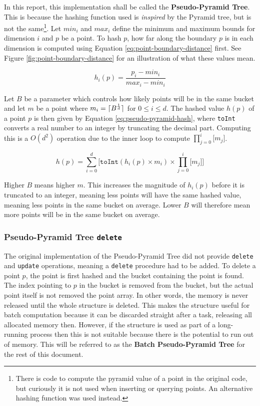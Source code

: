 In this report, this implementation shall be called the \textbf{Pseudo-Pyramid Tree}. This is because the hashing function used is \textit{inspired} by the Pyramid tree, but is not the same\footnote{There is code to compute the pyramid value of a point in the original code, but curiously it is not used when inserting or querying points. An alternative hashing function was used instead.}. Let $min_i$ and $max_i$ define the minimum and maximum bounds for dimension $i$ and $p$ be a point. To hash $p$, how far along the boundary $p$ is in each dimension is computed using Equation \ref{eq:point-boundary-distance} first. See Figure \ref{fig:point-boundary-distance} for an illustration of what these values mean.

\begin{equation}
	h_i(p) = \frac{p_i - min_i}{max_i - min_i}
	\label{eq:point-boundary-distance}
\end{equation}

Let $B$ be a parameter which controls how likely points will be in the same bucket and let $m$ be a point where $m_i = \lceil B^{\frac{1}{d}}\rceil$ for $0 \leq i \leq d$. The hashed value $h(p)$ of a point $p$ is then given by Equation \ref{eq:pseudo-pyramid-hash},  where \texttt{toInt} converts a real number to an integer by truncating the decimal part. Computing this is a $O(d^2)$ operation due to the inner loop to compute $\prod_{j=0}^{i}{\lbrack m_j \rbrack}$.

\begin{equation}
	h(p) = \sum_{i = 0}^{d} { \lbrack \texttt{toInt}( h_i(p) \times m_i ) \times \prod_{j=0}^{i}{\lbrack m_j \rbrack} \rbrack }
	\label{eq:pseudo-pyramid-hash}
\end{equation}

Higher $B$ means higher $m$. This increases the magnitude of $h_i(p)$ before it is truncated to an integer, meaning less points will have the same hashed value, meaning less points in the same bucket on average. Lower $B$ will therefore mean more points will be in the same bucket on average.

\subsubsection{Pseudo-Pyramid Tree \texttt{delete}}

The original implementation of the Pseudo-Pyramid Tree did not provide \texttt{delete} and \texttt{update} operations, meaning a \texttt{delete} procedure had to be added. To delete a point $p$, the point is first hashed and the bucket containing the point is found. The index pointing to $p$ in the bucket is removed from the bucket, but the actual point itself is not removed the point array. In other words, the memory is never released until the whole structure is deleted. This makes the structure useful for batch computation because it can be discarded straight after a task, releasing all allocated memory then. However, if the structure is used as part of a long-running process then this is not suitable because there is the potential to run out of memory. This will be referred to as the \textbf{Batch Pseudo-Pyramid Tree} for the rest of this document.

